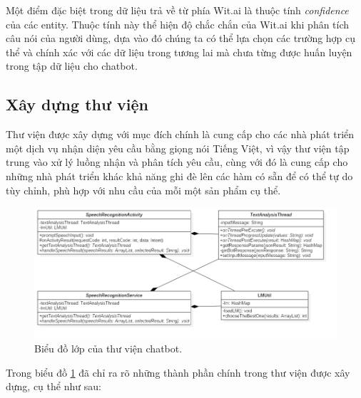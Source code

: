 \documentclass[12pt]{report}
\begin{document}
Một điểm đặc biệt trong dữ liệu trả về từ phía Wit.ai là thuộc tính \textit{confidence} của các entity. Thuộc tính này thể hiện độ chắc chắn của Wit.ai khi phân tích câu nói của người dùng, dựa vào đó chúng ta có thể lựa chọn các trường hợp cụ thể và chính xác với các dữ liệu trong tương lai mà chưa từng được huấn luyện trong tập dữ liệu cho chatbot.

\subsection{Xây dựng thư viện}

Thư viện được xây dựng với mục đích chính là cung cấp cho các nhà phát triển một dịch vụ nhận diện yêu cầu bằng giọng nói Tiếng Việt, vì vậy thư viện tập trung vào xử lý luồng nhận và phân tích yêu cầu, cùng với đó là cung cấp cho những nhà phát triển khác khả năng ghi đè lên các hàm có sẵn để có thể tự do tùy chỉnh, phù hợp với nhu cầu của mỗi một sản phẩm cụ thể.

\begin{figure}[H]
	\centering
	\includegraphics[width=15cm]{Pics/Chap6/library-model.png}
	\caption{Biểu đồ lớp của thư viện chatbot.}
	\label{fig:library-model}
\end{figure}

Trong biểu đồ \ref{fig:library-model} đã chỉ ra rõ những thành phần chính trong thư viện được xây dựng, cụ thể như sau:
\end{document}

